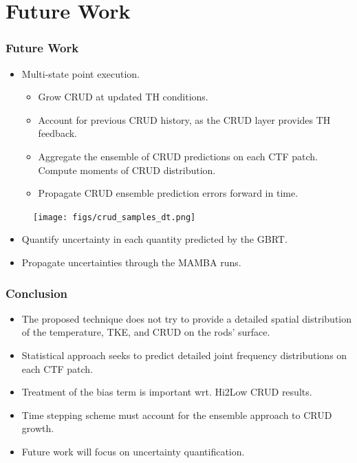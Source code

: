 \documentclass[t, pdftex]{beamer}
\begin{document}
\section{Future Work}
\begin{frame}\frametitle{Future Work}
\begin{itemize}
\item Multi-state point execution.
\begin{itemize}
	\item Grow CRUD at updated TH conditions.
	\item Account for previous CRUD history, as the CRUD layer provides TH feedback.
	\item Aggregate the ensemble of CRUD predictions on each CTF patch.  Compute moments of CRUD distribution.
	\item Propagate CRUD ensemble prediction errors forward in time.
\end{itemize}
\end{itemize}
\begin{figure}[!htbp]
\centering
\texttt{[image: figs/crud\_samples\_dt.png]}
\label{model_overview}
\end{figure}
\begin{itemize}
\item Quantify uncertainty in each quantity predicted by the GBRT.
\item Propagate uncertainties through the MAMBA runs.
\end{itemize}
\end{frame}

\begin{frame}
\frametitle{Conclusion}
\begin{itemize}
\item The proposed technique does not try to provide a detailed spatial distribution
of the temperature, TKE, and CRUD on the rods' surface.
\item Statistical approach seeks to predict detailed joint frequency distributions on each CTF patch.
\item Treatment of the bias term is important wrt. Hi2Low CRUD results.
\item Time stepping scheme must account for the ensemble approach to CRUD growth.
\item Future work will focus on uncertainty quantification.
\end{itemize}
\end{frame}
\end{document}
